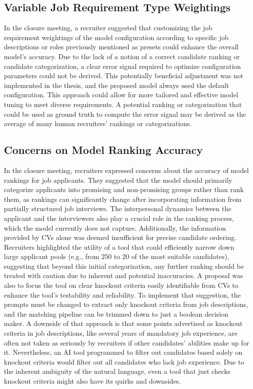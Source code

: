 \documentclass[draft,final]{thesisclass} %
\begin{document}
\subsection{Variable Job Requirement Type Weightings} \label{interpretation_variable_job_requirement_type_weightings}
In the closure meeting, a recruiter suggested that customizing the job requirement weightings of the model configuration according to specific job descriptions or roles previously mentioned as presets could enhance the overall model's accuracy. Due to the lack of a notion of a correct candidate ranking or candidate categorization, a clear error signal required to optimize configuration parameters could not be derived. This potentially beneficial adjustment was not implemented in the thesis, and the proposed model always used the default configuration. This approach could allow for more tailored and effective model tuning to meet diverse requirements. A potential ranking or categorization that could be used as ground truth to compute the error signal may be derived as the average of many human recruiters' rankings or categorizations.

\subsection{Concerns on Model Ranking Accuracy}
In the closure meeting, recruiters expressed concerns about the accuracy of model rankings for job applicants. They suggested that the model should primarily categorize applicants into promising and non-promising groups rather than rank them, as rankings can significantly change after incorporating information from partially structured job interviews. The interpersonal dynamics between the applicant and the interviewers also play a crucial role in the ranking process, which the model currently does not capture. Additionally, the information provided by \acs{CV}s alone was deemed insufficient for precise candidate ordering. Recruiters highlighted the utility of a tool that could efficiently narrow down large applicant pools (e.g., from $250$ to $20$ of the most suitable candidates), suggesting that beyond this initial categorization, any further ranking should be treated with caution due to inherent and potential inaccuracies. A proposal was also to focus the tool on clear knockout criteria easily identifiable from \acs{CV}s to enhance the tool's testability and reliability. To implement that suggestion, the prompts must be changed to extract only knockout criteria from job descriptions, and the matching pipeline can be trimmed down to just a boolean decision maker. A downside of that approach is that some points advertised as knockout criteria in job descriptions, like several years of mandatory job experience, are often not taken as seriously by recruiters if other candidates' abilities make up for it. Nevertheless, an \acs{AI} tool programmed to filter out candidates based solely on knockout criteria would filter out all candidates who lack job experience. Due to the inherent ambiguity of the natural language, even a tool that just checks knockout criteria might also have its quirks and downsides.
\end{document}
